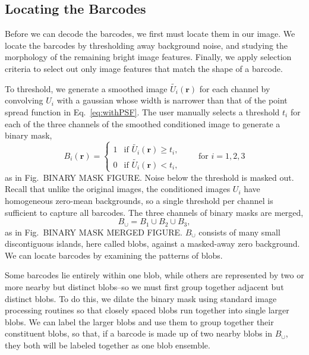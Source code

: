 \subsection{Locating the Barcodes} \label{sec:locatingBarcodes}
Before we can decode the barcodes, we first must locate them in our image. We locate the barcodes by thresholding away background noise, and studying the morphology of the remaining bright image features. Finally, we apply selection criteria to select out only image features that match the shape of a barcode. 

 To threshold, we generate a smoothed image $\tilde{U_i}(\mathbf{r})$ for each channel by convolving $U_i$ with a gaussian whose width is narrower than that of the point spread function in Eq.~\ref{eq:withPSF}. The user manually selects a threshold $t_i$ for each of the three channels of the smoothed conditioned image to generate a binary mask,
\begin{equation}
	B_i(\mathbf{r}) = \left\{
	\begin{array}{rl}
		 1 & \text{if } \tilde{U_i}(\mathbf{r}) \geq t_i,\\
		 0 & \text{if } \tilde{U_i}(\mathbf{r}) < t_i,
	\end{array} \right. \qquad\text{for } i=1,2,3
\end{equation}
as in Fig.~BINARY MASK FIGURE. Noise below the threshold is masked out. Recall that unlike the original images, the conditioned images $U_i$ have homogeneous zero-mean  backgrounds, so a single threshold per channel is sufficient to capture all barcodes. The three channels of binary masks are merged, 
\begin{equation}
B_{\cup}=B_1\cup B_2 \cup B_3, 
\end{equation}
as in Fig.~BINARY MASK MERGED FIGURE. $B_\cup$ consists of many small discontiguous islands, here called blobs, against a masked-away zero background.  We can locate barcodes by examining the patterns of blobs.

Some barcodes lie entirely within one blob, while others are represented by two or more nearby but distinct blobs--so we must first  group together adjacent but distinct blobs.  To do this, we dilate the binary mask using standard image processing routines \citep{matlab_version_2010} so that closely spaced blobs run together into single larger blobs. We can label the larger blobs and use them to group together their constituent blobs, so that, if a barcode is made up of two nearby blobs in $B_\cup$, they both will be labeled together as one blob ensemble.

